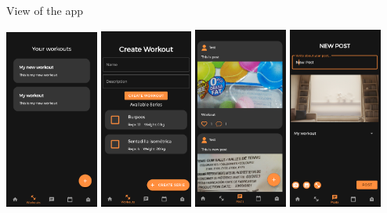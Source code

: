 \documentclass[12pt]{beamer}
\begin{document}
\begin{frame}{View of the app}
{\begin{center}
\includegraphics[width=0.23\textwidth]{pres_1}
\includegraphics[width=0.23\textwidth]{pres_2}
\includegraphics[width=0.23\textwidth]{pres_3}
\includegraphics[width=0.23\textwidth]{pres_4}
\end{center}
}

\end{frame}
\end{document}
